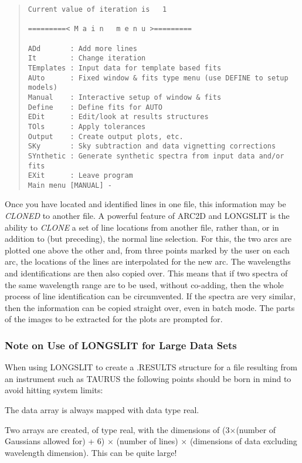 \begin{quote}\begin{verbatim}
Current value of iteration is   1

=========< M a i n   m e n u >=========

ADd       : Add more lines
It        : Change iteration
TEmplates : Input data for template based fits
AUto      : Fixed window & fits type menu (use DEFINE to setup models)
Manual    : Interactive setup of window & fits
Define    : Define fits for AUTO
EDit      : Edit/look at results structures
TOls      : Apply tolerances
Output    : Create output plots, etc.
SKy       : Sky subtraction and data vignetting corrections
SYnthetic : Generate synthetic spectra from input data and/or fits
EXit      : Leave program
Main menu [MANUAL] -
\end{verbatim}\end{quote}

Once you have located and identified lines in one file, this information
may be {\em CLONED} to another file.
A powerful feature of ARC2D and LONGSLIT
is the ability to {\em CLONE} a set of line locations from another
file, rather than, or in addition to (but preceding), the normal line
selection. For this, the two arcs are plotted one above the other
and, from three points marked by the user on each
arc, the locations of the lines are interpolated for the new arc. The
wavelengths and identifications are then also copied over. This means
that if two spectra of the same wavelength range are to be used,
without co-adding, then the whole process of line identification can be
circumvented. If the spectra are very similar, then the information can
be copied straight over, even in batch mode.
The parts of the images to be extracted for the plots are prompted for.

\subsubsection{Note on Use of LONGSLIT for Large Data Sets}

When using LONGSLIT to create a .RESULTS structure for a file
resulting from an instrument such as TAURUS the following points should
be born in mind to avoid hitting system limits:
\begin{list}{()}{}
\item The data array is always mapped with data type real.
\item Two arrays are created, of type real, with the dimensions of
(3$\times$(number of Gaussians allowed for) + 6) $\times$ (number of
lines) $\times$ (dimensions of data excluding wavelength dimension).
This can be quite large!
\end{list}

